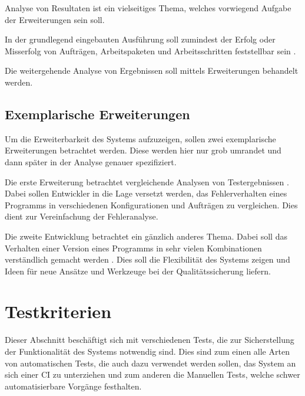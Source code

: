 Analyse von Resultaten ist ein vielseitiges Thema,
welches vorwiegend Aufgabe der Erweiterungen sein soll.

In der grundlegend eingebauten Ausf\"uhrung soll zumindest der Erfolg oder Misserfolg
von Auftr\"agen, Arbeitspaketen und Arbeitsschritten feststellbar sein .

Die weitergehende Analyse von Ergebnissen soll mittels Erweiterungen behandelt werden.

\subsection{Exemplarische Erweiterungen}

Um die Erweiterbarkeit des Systems aufzuzeigen,
sollen zwei exemplarische Erweiterungen betrachtet werden.
Diese werden hier nur grob umrandet und dann sp\"ater in der Analyse genauer spezifiziert.

Die erste Erweiterung betrachtet vergleichende Analysen von Testergebnissen .
Dabei sollen Entwickler in die Lage versetzt werden,
das Fehlerverhalten eines Programms in verschiedenen Konfigurationen und Auftr\"agen zu vergleichen.
Dies dient zur Vereinfachung der Fehleranalyse.

Die zweite Entwicklung betrachtet ein gänzlich anderes Thema.
Dabei soll das Verhalten einer Version eines Programms
in sehr vielen Kombinationen verst\"andlich gemacht werden .
Dies soll die Flexibilit\"at des Systems zeigen und
Ideen f\"ur neue Ans\"atze und Werkzeuge bei der Qualit\"atssicherung liefern.





\section{Testkriterien}
\label{sec:target:tests}

Dieser Abschnitt beschäftigt sich mit verschiedenen Tests,
die zur Sicherstellung der Funktionalität des Systems notwendig sind.
Dies sind zum einen alle Arten von automatischen Tests,
die auch dazu verwendet werden sollen, das System an sich einer \ac{CI} zu unterziehen
und zum anderen die Manuellen Tests, welche schwer automatisierbare Vorgänge festhalten.



